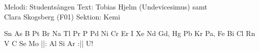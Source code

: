 \begin{song}


\begin{songmeta}
Melodi: Studentsången
Text: Tobias Hjelm (Undevicesimus) samt \\ Clara Skogsberg (F01)
Sektion: Kemi
\end{songmeta}

\begin{songtext}
Sn As B Pt Br
Na Tl Pr
P Pd Ni Cr
Er I Xe Nd
Gd, Hg Pb Kr
Pa, Fe Bi Cl Rn
V C Se Mo
||: Al Si Ar :||
U!
\end{songtext}

\end{song}
